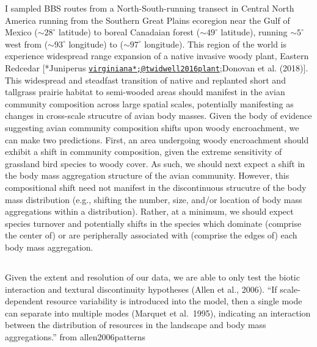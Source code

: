 \documentclass[12pt,twoside,openany]{reedthesis}
\begin{document}
I sampled BBS routes from a North-South-running transect in Central North America running from the Southern Great Plains ecoregion near the Gulf of Mexico (\(\sim 28^\circ\) latitude) to boreal Canadaian forest (\(\sim 49^\circ\) latitude), running \(\sim 5^\circ\) west from (\(\sim 93^\circ\) longitude) to (\(\sim 97^\circ\) longitude). This region of the world is experience widespread range expansion of a native invasive woody plant, Eastern Redcedar {[}*Juniperus \href{mailto:virginiana*;@twidwell2016plant}{\nolinkurl{virginiana*;@twidwell2016plant}};Donovan et al. (2018){]}. This widespread and steadfast transition of native and replanted short and tallgrass prairie habitat to semi-wooded areas should manifest in the avian community composition across large spatial scales, potentially manifesting as changes in cross-scale strucutre of avian body masses. Given the body of evidence suggesting avian community composition shifts upon woody encroachment, we can make two predictions. First, an area undergoing woody encroachment should exhibit a shift in community composition, given the extreme sensitivity of grassland bird species to woody cover. As such, we should next expect a shift in the body mass aggregation structure of the avian community. However, this compositional shift need not manifest in the discontinuous strucutre of the body mass distribution (e.g., shifting the number, size, and/or location of body mass aggregations within a distribution). Rather, at a minimum, we should expect species turnover and potentially shifts in the species which dominate (comprise the center of) or are peripherally associated with (comprise the edges of) each body mass aggregation.

\hypertarget{section}{%
\subsection{}\label{section}}

Given the extent and resolution of our data, we are able to only test the biotic interaction and textural discontinuity hypotheses (Allen et al., 2006).
``If scale‐dependent resource variability is introduced into the model, then a single mode can separate into multiple modes (Marquet et al.~1995), indicating an interaction between the distribution of resources in the landscape and body mass aggregations.'' from allen2006patterns
\end{document}
